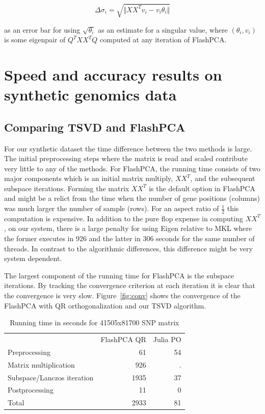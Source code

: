 \documentclass[review]{siamart0516}
\begin{document}
\[
\Delta \sigma_i = \sqrt{\Vert X X^T v_i - v_i \theta_i \Vert}
\]

as an error bar for using $\sqrt{\theta_i}$ as an estimate for a singular value,
where $(\theta_i, v_i)$ is some eigenpair of $Q^T X X^T Q$ computed at any
iteration of FlashPCA.



\section{Speed and accuracy results on synthetic genomics data}

\subsection{Comparing TSVD and FlashPCA}
For our synthetic dataset the time difference between the two methods is large. The initial preprocessing steps where the matrix is read and scaled contribute very little to any of the methods. For FlashPCA, the running time consists of two major components which is an initial matrix multiply, $XX^T$, and the subsequent subspace iterations. Forming the matrix $XX^T$ is the default option in FlashPCA and might be a relict from the time when the number of gene positions (columns) was much larger the number of sample (rows). For an aspect ratio of $\frac{1}{2}$ this computation is expensive. In addition to the pure flop expense in computing $XX^T$, on our system, there is a large penalty for using Eigen relative to MKL where the former executes in 926 and the latter in 306 seconds for the same number of threads. In contrast to the algorithmic differences, this difference might be very system dependent.

The largest component of the running time for FlashPCA is the subspace iterations. By tracking the convergence criterion at each iteration it is clear that the convergence is very slow. Figure~\ref{fig:conv} shows the convergence of the FlashPCA with QR orthogonalization and our TSVD algorithm.

\begin{table}
    \caption{Running time in seconds for 41505x81700 SNP matrix}
    \centering
    \begin{tabular}{lrr}
                                   & FlashPCA QR & Julia PO \\
        Preprocessing              &   61        & 54            \\
        Matrix multiplication      &  926        & .             \\
        Subspace/Lanczos iteration & 1935        & 37            \\
        Postprocessing             &   11        & 0             \\
        Total                      & 2933        & 81
    \end{tabular}
\end{table}
\end{document}

